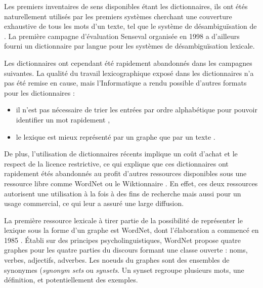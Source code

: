 Les premiers inventaires de sens disponibles étant les dictionnaires, ils ont
étés naturellement utilisés par les premiers systèmes cherchant une couverture
exhaustive de tous les mots d'un texte, tel que le système de désambiguïsation
de \cite{lesk1986automatic}. La première campagne d'évaluation Senseval
organisée en 1998 \citep{kilgarriff2000introduction} a d'ailleurs fourni un
dictionnaire par langue pour les systèmes de désambiguïsation lexicale.

Les dictionnaires ont cependant été rapidement abandonnés dans les campagnes
suivantes. La qualité du travail lexicographique exposé dans les dictionnaires
n'a pas été remise en cause, mais l'Informatique a rendu possible d'autres
formats pour les dictionnaires :

\begin{itemize}

    \item il n'est pas nécessaire de trier les entrées par ordre alphabétique
        pour pouvoir identifier un mot rapidement
        \citep{miller1990introduction},

    \item le lexique est mieux représenté par un graphe que par un texte
        \citep{polguere2013tissage}.

\end{itemize}

De plus, l'utilisation de dictionnaires récents implique un coût d'achat et le
respect de la licence restrictive, ce qui explique que ces dictionnaires ont
rapidement étés abandonnés au profit d'autres ressources disponibles sous une
ressource libre comme WordNet \citep{edmonds2002introduction} ou le
Wiktionnaire \citep{mouton2010jaws,nguyen2012using}. En effet, ces deux
ressources autorisent une utilisation à la fois à des fins de recherche mais
aussi pour un usage commercial, ce qui leur a assuré une large diffusion.

La première ressource lexicale à tirer partie de la possibilité de représenter
le lexique sous la forme d'un graphe est WordNet, dont l'élaboration a commencé
en 1985 \citep{miller1990introduction}. Établi sur des principes
psycholinguistiques, WordNet propose quatre graphes pour les quatre parties du
discours formant une classe ouverte : noms, verbes, adjectifs, adverbes. Les
noeuds du graphes sont des ensembles de synonymes (\emph{synonym sets} ou
\emph{synsets}. Un synset regroupe plusieurs mots, une définition, et
potentiellement des exemples.

